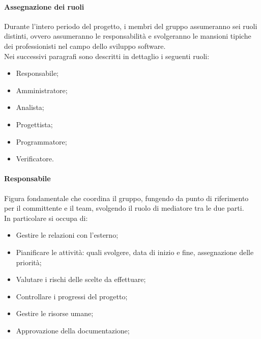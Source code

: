 \paragraph{Assegnazione dei ruoli}

Durante l'intero periodo del progetto, i membri del gruppo assumeranno sei ruoli distinti, ovvero assumeranno le responsabilità e svolgeranno le mansioni tipiche dei professionisti nel campo dello sviluppo software. \\
Nei successivi paragrafi sono descritti in dettaglio i seguenti ruoli:
\begin{itemize}
  \item Responsabile;
  \item Amministratore;
  \item Analista;
  \item Progettista;
  \item Programmatore;
  \item Verificatore.
\end{itemize}

\paragraph{Responsabile}\label{responsabile} Figura fondamentale che coordina il gruppo, fungendo da punto di riferimento per il committente e il team, svolgendo il ruolo di mediatore tra le due parti. \\
In particolare si occupa di:
\begin{itemize}
    \item Gestire le relazioni con l'esterno;
    \item Pianificare le attività: quali svolgere, data di inizio e fine, assegnazione delle priorità;
    \item Valutare i rischi delle scelte da effettuare;
    \item Controllare i progressi del progetto;
    \item Gestire le risorse umane;
    \item Approvazione della documentazione;
\end{itemize}


